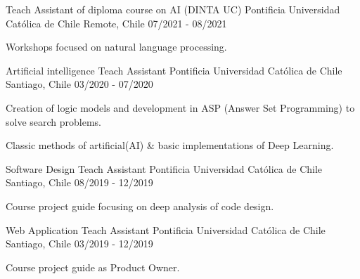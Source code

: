 \begin{cventries}
  
  \newline
  \cventry
  {Teach Assistant of diploma course on AI (DINTA UC)} %
  {Pontificia Universidad Católica de Chile} %
  {Remote, Chile} %
  {07/2021 - 08/2021} %
  {
    \begin{cvitems} %
      \item {Workshops focused on natural language processing.}
    \end{cvitems}
  }
  \newline
  \cventry
  {Artificial intelligence Teach Assistant} %
  {Pontificia Universidad Católica de Chile} %
  {Santiago, Chile} %
  {03/2020 - 07/2020} %
  {
    \begin{cvitems} %
      \item {Creation of logic models and development in ASP (Answer Set Programming) to solve search problems.}
      \item {Classic methods of artificial(AI) \& basic implementations of Deep Learning.}
    \end{cvitems}
  }
  \newline

  \cventry
  {Software Design Teach Assistant} %
  {Pontificia Universidad Católica de Chile} %
  {Santiago, Chile} %
  {08/2019 - 12/2019} %
  {
    \begin{cvitems} %
      \item {Course project guide focusing on deep analysis of code design. }
    \end{cvitems}
  }
  \newline

  \cventry
  {Web Application Teach Assistant} %
  {Pontificia Universidad Católica de Chile} %
  {Santiago, Chile} %
  {03/2019 - 12/2019} %
  {
    \begin{cvitems} %
      \item {Course project guide as Product Owner.}
    \end{cvitems}
  }
  \newline
\end{cventries}